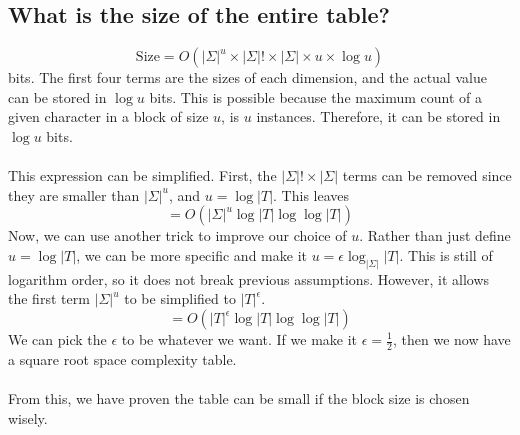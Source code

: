 \documentclass[10pt]{article}
\begin{document}
\subsection*{What is the size of the entire table?}
\[\text{Size} = O(|\Sigma|^u \times |\Sigma|! \times |\Sigma| \times u \times \log u)\]
bits.   The first four terms are the sizes of each dimension, and the actual value can be stored in $\log u$ bits.  This is possible because the maximum count of a given character in a block of size $u$, is $u$ instances.  Therefore, it can be stored in $\log u$ bits.\\\\
This expression can be simplified.  First, the $|\Sigma|! \times |\Sigma|$ terms can be removed since they are smaller than $|\Sigma|^u$, and $u = \log |T|$.  This leaves
\[ = O(|\Sigma|^u \log |T| \log \log |T|)\]
Now, we can use another trick to improve our choice of $u$.  Rather than just define $u = \log |T|$, we can be more specific and make it $u = \epsilon \log_{|\Sigma|}|T|$.  This is still of logarithm order, so it does not break previous assumptions.  However, it allows the first term $|\Sigma|^u$ to be simplified to $|T|^\epsilon$.
\[ = O(|T|^\epsilon \log |T| \log \log |T|)\]
We can pick the $\epsilon$ to be whatever we want.  If we make it $\epsilon = \frac{1}{2}$, then we now have a square root space complexity table.\\\\
From this, we have proven the table can be small if the block size is chosen wisely.
\end{document}

